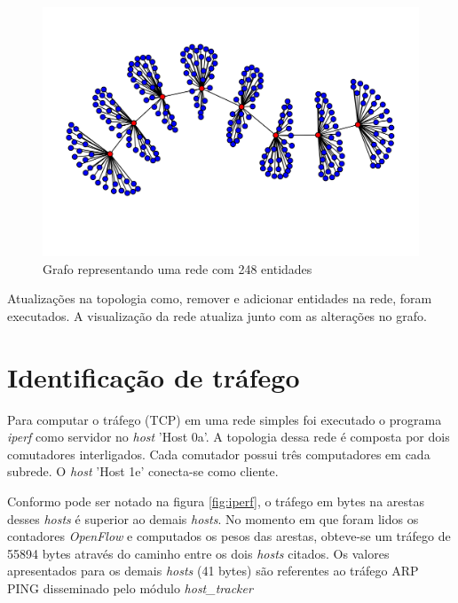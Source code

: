 \begin{figure}[h!]
    \centering
    \includegraphics[width=\textwidth]{img/full-graph}
    \caption{Grafo representando uma rede com 248 entidades}
    \label{fig:full-graph}
\end{figure}

Atualizações na topologia como, remover e adicionar entidades na rede, foram
executados.
A visualização da rede atualiza junto com as alterações no grafo.

\section{Identificação de tráfego}

Para computar o tráfego (TCP) em uma rede simples foi executado o programa 
\emph{iperf} como servidor no \emph{host} 'Host 0a'.
A topologia dessa rede é composta por dois comutadores interligados.
Cada comutador possui três computadores em cada subrede.
O \emph{host} 'Host 1e' conecta-se como cliente. 

Conformo pode ser notado na figura \ref{fig:iperf}, o tráfego 
em bytes na arestas desses \emph{hosts} é superior ao demais \emph{hosts}.
No momento em que foram lidos os contadores \emph{OpenFlow} e computados
os pesos das arestas, obteve-se um tráfego de 55894 bytes através do caminho
entre os dois \emph{hosts} citados.
Os valores apresentados para os demais \emph{hosts} (41 bytes) são referentes
ao tráfego ARP PING disseminado pelo módulo \emph{host\_tracker}

